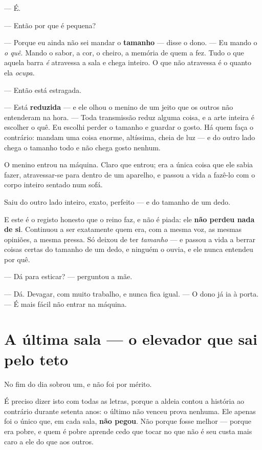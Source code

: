 \documentclass[livro.tex]{subfiles}
\begin{document}
--- É.

--- Então por que é pequena?

--- Porque eu ainda não sei mandar o \textbf{tamanho} --- disse o dono. --- Eu mando o
\emph{o quê}. Mando o sabor, a cor, o cheiro, a memória de quem a fez. Tudo o que aquela
barra \emph{é} atravessa a sala e chega inteiro. O que não atravessa é o quanto ela
\emph{ocupa}.

--- Então está estragada.

--- Está \textbf{reduzida} --- e ele olhou o menino de um jeito que os outros não
entenderam na hora. --- Toda transmissão reduz alguma coisa, e a arte inteira é escolher
o quê. Eu escolhi perder o tamanho e guardar o gosto. Há quem faça o contrário: mandam
uma coisa enorme, altíssima, cheia de luz --- e do outro lado chega o tamanho todo e não
chega gosto nenhum.

\medskip

O menino entrou na máquina. Claro que entrou; era a única coisa que ele sabia fazer,
atravessar-se para dentro de um aparelho, e passou a vida a fazê-lo com o corpo inteiro
sentado num sofá.

Saiu do outro lado inteiro, exato, perfeito --- e do tamanho de um dedo.

E este é o registo honesto que o reino faz, e não é piada: ele \textbf{não perdeu nada de
si}. Continuou a ser exatamente quem era, com a mesma voz, as mesmas opiniões, a mesma
pressa. Só deixou de ter \emph{tamanho} --- e passou a vida a berrar coisas certas do
tamanho de um dedo, e ninguém o ouvia, e ele nunca entendeu por quê.

--- Dá para esticar? --- perguntou a mãe.

--- Dá. Devagar, com muito trabalho, e nunca fica igual. --- O dono já ia à porta. --- É
mais fácil não entrar na máquina.

\chapter{A última sala --- o elevador que sai pelo teto}

No fim do dia sobrou um, e não foi por mérito.

É preciso dizer isto com todas as letras, porque a aldeia contou a história ao contrário
durante setenta anos: o último não venceu prova nenhuma. Ele apenas foi o único que, em
cada sala, \textbf{não pegou}. Não porque fosse melhor --- porque era pobre, e quem é
pobre aprende cedo que tocar no que não é seu custa mais caro a ele do que aos outros.
\end{document}
